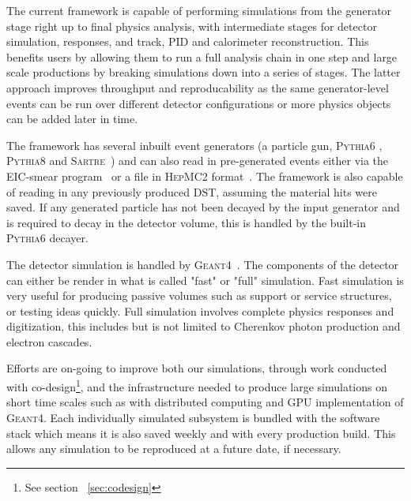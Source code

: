 	The current framework is capable of performing simulations from the generator stage right up to final physics analysis, with intermediate stages for detector simulation, responses, and track, PID and calorimeter reconstruction. This benefits users by allowing them to run a full analysis chain in one step and large scale productions by breaking simulations down into a series of stages. The latter approach improves throughput and reproducability as the same generator-level events can be run over different detector configurations or more physics objects can be added later in time.
	
	The framework has several inbuilt event generators (a particle gun, \textsc{Pythia6} \cite{Sjostrand:2000wi}, \textsc{Pythia8} \cite{sjostrand2008brief} and \textsc{Sartre}~\cite{toll2014dipole}) and can also read in pre-generated events either via the EIC-smear program~\cite{eicsmear} or a file in \textsc{HepMC2} format~\cite{dobbs2001hepmc}. The framework is also capable of reading in any previously produced DST, assuming the material hits were saved. If any generated particle has not been decayed by the input generator and is required to decay in the detector volume, this is handled by the built-in \textsc{Pythia6} decayer. 
	
	The detector simulation is handled by \textsc{Geant4}~\cite{Agostinelli:2002hh}. The components of the detector can either be render in what is called "fast" or "full" simulation. Fast simulation is very useful for producing passive volumes such as support or service structures, or testing ideas quickly. Full simulation involves complete physics responses and digitization, this includes but is not limited to Cherenkov photon production and electron cascades. 
	
	Efforts are on-going to improve both our simulations, through work conducted with co-design\footnote{See section ~\ref{sec:codesign}}, and the infrastructure needed to produce large simulations on short time scales such as with distributed computing and GPU implementation of \textsc{Geant4}. Each individually simulated subsystem is bundled with the software stack which means it is also saved weekly and with every production build. This allows any simulation to be reproduced at a future date, if necessary. 
	
